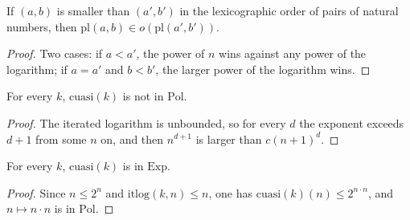 \begin{theorem}
  \label{thm:machines-scale-order}
  \leanok
  If $(a, b)$ is smaller than $(a', b')$ in the lexicographic order of pairs of natural numbers, then
  $\mathrm{pl}(a, b) \in o(\mathrm{pl}(a', b'))$.
\end{theorem}

\begin{proof}
  \leanok
  Two cases: if $a < a'$, the power of $n$ wins against any power of the logarithm; if $a = a'$ and
  $b < b'$, the larger power of the logarithm wins.
\end{proof}

\begin{theorem}
  \label{thm:machines-quasi-not-pol}
  \leanok
  For every $k$, $\mathrm{cuasi}(k)$ is not in $\mathrm{Pol}$.
\end{theorem}

\begin{proof}
  \leanok
  The iterated logarithm is unbounded, so for every $d$ the exponent exceeds $d + 1$ from some $n$ on, and
  then $n^{d+1}$ is larger than $c (n + 1)^d$.
\end{proof}

\begin{theorem}
  \label{thm:machines-quasi-exp}
  \leanok
  For every $k$, $\mathrm{cuasi}(k)$ is in $\mathrm{Exp}$.
\end{theorem}

\begin{proof}
  \leanok
  Since $n \le 2^n$ and $\mathrm{itlog}(k, n) \le n$, one has $\mathrm{cuasi}(k)(n) \le 2^{n \cdot n}$, and
  $n \mapsto n \cdot n$ is in $\mathrm{Pol}$.
\end{proof}

